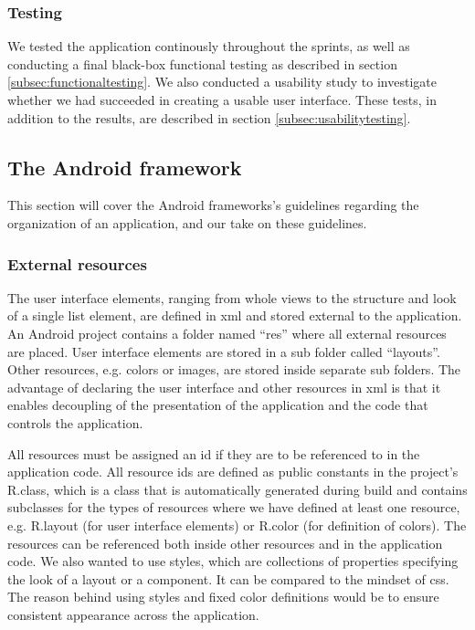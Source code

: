 \subsubsection{Testing}
We tested the application continously throughout the sprints, as well as conducting a final black-box functional testing as described in section \ref{subsec:functionaltesting}. We also conducted a usability study to investigate whether we had succeeded in creating a usable user interface. These tests, in addition to the results, are described in section \ref{subsec:usabilitytesting}.

\subsection{The Android framework}\label{subsec:androidframework}
This section will cover the Android frameworks's guidelines regarding the organization of an application, and our take on these guidelines. 

\subsubsection{External resources}
The user interface elements, ranging from whole views to the structure and look of a single list element, are defined in \gls{xml} and stored external to the application. An Android project contains a folder named “res” where all external resources are placed. User interface elements are stored in a sub folder called “layouts”. Other resources, e.g. colors or images, are stored inside separate sub folders. The advantage of declaring the user interface and other resources in \gls{xml} is that it enables decoupling of the presentation of the application and the code that controls the application.
\newline
\newline

\pagebreak

All resources must be assigned an \gls{id} if they are to be referenced to in the application code. All resource \gls{id}s are defined as public constants in the project's R.class, which is a class that is automatically generated during build and contains subclasses for the types of resources where we have defined at least one resource, e.g. R.layout (for user interface elements) or R.color (for definition of colors). The resources can be referenced both inside other resources and in the application code.
\newline
\newline
We also wanted to use styles, which are collections of properties specifying the look of a layout or a component. It can be compared to the mindset of \gls{css}. The reason behind using styles and fixed color definitions would be to ensure consistent appearance across the application. 

